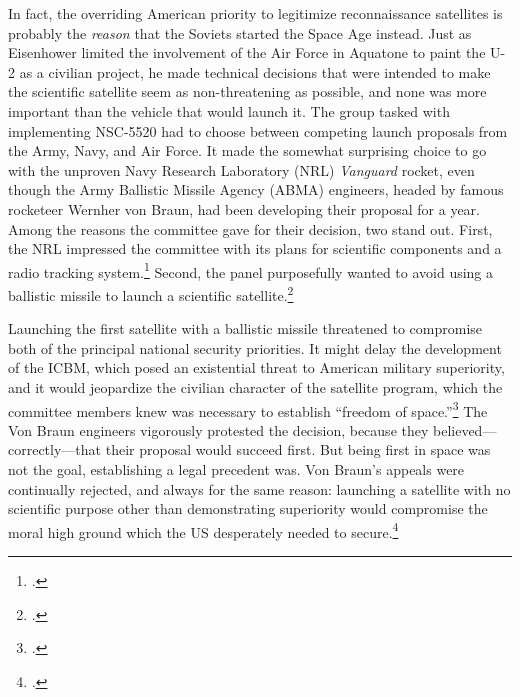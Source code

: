 \documentclass[11pt]{memoir}
\begin{document}
In fact, the overriding American priority to legitimize reconnaissance satellites is probably the \emph{reason} that the Soviets started the Space Age instead. Just as Eisenhower limited the involvement of the Air Force in Aquatone to paint the U-2 as a civilian project, he made technical decisions that were intended to make the scientific satellite seem as non-threatening as possible, and none was more important than the vehicle that would launch it. The group tasked with implementing NSC-5520 had to choose between competing launch proposals from the Army, Navy, and Air Force. It made the somewhat surprising choice to go with the unproven Navy Research Laboratory (NRL) \emph{Vanguard} rocket, even though the Army Ballistic Missile Agency (ABMA) engineers, headed by famous rocketeer Wernher von Braun, had been developing their proposal for a year. Among the reasons the committee gave for their decision, two stand out. First, the NRL impressed the committee with its plans for scientific components and a radio tracking system.\footcite[p.~122]{mcdougall_heavens_1985} Second, the panel purposefully wanted to avoid using a ballistic missile to launch a scientific satellite.\footcite[p.~129. Though the NRL is run by the Navy, it functions like a civilian scientific operation. Everything that I have read about this decision seems to take it for granted that despite the Navy involement, the NRL proposal would be seen as a civilian project. This makes sense to me, especially when you consider that it was competiting with the same agency that was building nuclear delivery systems.]{day_eye_2015}

Launching the first satellite with a ballistic missile threatened to compromise both of the principal national security priorities. It might delay the development of the ICBM, which posed an existential threat to American military superiority, and it would jeopardize the civilian character of the satellite program, which the committee members knew was necessary to establish ``freedom of space.''\footcite[p.~122]{mcdougall_heavens_1985} The Von Braun engineers vigorously protested the decision, because they believed---correctly---that their proposal would succeed first. But being first in space was not the goal, establishing a legal precedent was. Von Braun's appeals were continually rejected, and always for the same reason: launching a satellite with no scientific purpose other than demonstrating superiority would compromise the moral high ground which the US desperately needed to secure.\footcite[p.~131]{day_eye_2015}
\end{document}
